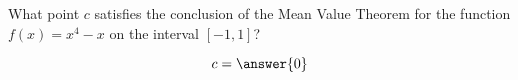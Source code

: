 \documentclass{ximera}
\author{Steven Gubkin}
\begin{document}
\begin{exercise}



What point $c$ satisfies the conclusion of the Mean Value Theorem for the function $f(x) = x^4-x$ on the interval
$[-1,1]$?

\begin{prompt}
	$$c = \answer{0}$$
\end{prompt}

\end{exercise}
\end{document}
